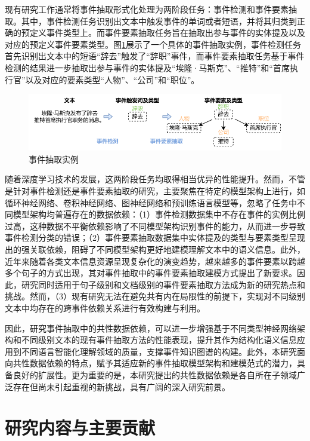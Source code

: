 现有研究工作通常将事件抽取形式化处理为两阶段任务：事件检测和事件要素抽取。其中，事件检测任务识别出文本中触发事件的单词或者短语，并将其归类到正确的预定义事件类型上。而事件要素抽取任务旨在抽取出参与事件的实体提及以及对应的预定义事件要素类型。图\ref{example_chap1}展示了一个具体的事件抽取实例，事件检测任务首先识别出文本中的短语“辞去”触发了“辞职”事件，而事件要素抽取任务基于事件检测的结果进一步抽取出参与事件的实体提及“埃隆·马斯克”、“推特”和“首席执行官”以及对应的要素类型“人物”、“公司”和“职位”。

\begin{figure}[htp]
    \centering
   \includegraphics[width=1\linewidth]{figures/chap1/example_chap1.pdf}
   \caption{事件抽取实例}
   \label{example_chap1}
\end{figure}

随着深度学习技术的发展，这两阶段任务均取得相当优异的性能提升。然而，不管是针对事件检测还是事件要素抽取的研究，主要聚焦在特定的模型架构上进行，如循环神经网络、卷积神经网络、图神经网络和预训练语言模型等，忽略了任务中不同模型架构均普遍存在的数据依赖：（1）事件检测数据集中不存在事件的实例比例过高，这种数据不平衡依赖影响了不同模型架构识别事件的能力，从而进一步导致事件检测分类的错误；（2）事件要素抽取数据集中实体提及的类型与要素类型呈现出的强关联依赖，阻碍了不同模型架构更好地建模理解文本中的语义信息。此外，近年来随着各类文本信息资源呈现复杂化的演变趋势，越来越多的事件要素以跨越多个句子的方式出现，其对事件抽取中的事件要素抽取建模方式提出了新要求。因此，研究同时适用于句子级别和文档级别的事件要素抽取方法成为新的研究热点和挑战。然而，（3）现有研究无法在避免共有内在局限性的前提下，实现对不同级别文本中均存在的跨事件依赖关系进行有效构建与利用。

因此，研究事件抽取中的共性数据依赖，可以进一步增强基于不同类型神经网络架构和不同级别文本的现有事件抽取方法的性能表现，提升其作为结构化语义信息应用到不同语言智能化理解领域的质量，支撑事件知识图谱的构建。此外，本研究面向共性数据依赖的特点，赋予其适应新的事件抽取模型架构和建模范式的潜力，具备良好的扩展性。更为重要的是，本研究提出的共性数据依赖是各自所在子领域广泛存在但尚未引起重视的新挑战，具有广阔的深入研究前景。

\section{研究内容与主要贡献}

